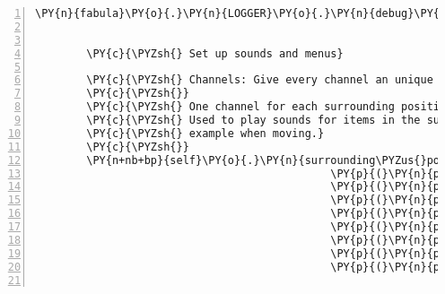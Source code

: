 \begin{Verbatim}[commandchars=\\\{\},numbers=left,firstnumber=1,stepnumber=1]
        \PY{n}{fabula}\PY{o}{.}\PY{n}{LOGGER}\PY{o}{.}\PY{n}{debug}\PY{p}{(}\PY{l+s}{\PYZdq{}}\PY{l+s}{Audio engine based on pyttsx added}\PY{l+s}{\PYZdq{}}\PY{p}{)}


        \PY{c}{\PYZsh{} Set up sounds and menus}

        \PY{c}{\PYZsh{} Channels: Give every channel an unique ID}
        \PY{c}{\PYZsh{}}
        \PY{c}{\PYZsh{} One channel for each surrounding position including client position.}
        \PY{c}{\PYZsh{} Used to play sounds for items in the surrounding positions \PYZhy{} for}
        \PY{c}{\PYZsh{} example when moving.}
        \PY{c}{\PYZsh{}}
        \PY{n+nb+bp}{self}\PY{o}{.}\PY{n}{surrounding\PYZus{}position\PYZus{}channels} \PY{o}{=} \PY{p}{[}\PY{p}{(}\PY{n}{pygame}\PY{o}{.}\PY{n}{mixer}\PY{o}{.}\PY{n}{Channel}\PY{p}{(}\PY{l+m+mi}{0}\PY{p}{)}\PY{p}{,} \PY{l+m+mf}{0.7}\PY{p}{,} \PY{l+m+mf}{0.5}\PY{p}{)}\PY{p}{,}
                                              \PY{p}{(}\PY{n}{pygame}\PY{o}{.}\PY{n}{mixer}\PY{o}{.}\PY{n}{Channel}\PY{p}{(}\PY{l+m+mi}{1}\PY{p}{)}\PY{p}{,} \PY{l+m+mf}{0.8}\PY{p}{,} \PY{l+m+mf}{0.8}\PY{p}{)}\PY{p}{,}
                                              \PY{p}{(}\PY{n}{pygame}\PY{o}{.}\PY{n}{mixer}\PY{o}{.}\PY{n}{Channel}\PY{p}{(}\PY{l+m+mi}{2}\PY{p}{)}\PY{p}{,} \PY{l+m+mf}{0.5}\PY{p}{,} \PY{l+m+mf}{0.7}\PY{p}{)}\PY{p}{,}
                                              \PY{p}{(}\PY{n}{pygame}\PY{o}{.}\PY{n}{mixer}\PY{o}{.}\PY{n}{Channel}\PY{p}{(}\PY{l+m+mi}{3}\PY{p}{)}\PY{p}{,} \PY{l+m+mf}{0.0}\PY{p}{,} \PY{l+m+mf}{0.8}\PY{p}{)}\PY{p}{,}
                                              \PY{p}{(}\PY{n}{pygame}\PY{o}{.}\PY{n}{mixer}\PY{o}{.}\PY{n}{Channel}\PY{p}{(}\PY{l+m+mi}{4}\PY{p}{)}\PY{p}{,} \PY{l+m+mf}{0.3}\PY{p}{,} \PY{l+m+mf}{0.5}\PY{p}{)}\PY{p}{,}
                                              \PY{p}{(}\PY{n}{pygame}\PY{o}{.}\PY{n}{mixer}\PY{o}{.}\PY{n}{Channel}\PY{p}{(}\PY{l+m+mi}{5}\PY{p}{)}\PY{p}{,} \PY{l+m+mf}{0.4}\PY{p}{,} \PY{l+m+mf}{0.4}\PY{p}{)}\PY{p}{,}
                                              \PY{p}{(}\PY{n}{pygame}\PY{o}{.}\PY{n}{mixer}\PY{o}{.}\PY{n}{Channel}\PY{p}{(}\PY{l+m+mi}{6}\PY{p}{)}\PY{p}{,} \PY{l+m+mf}{0.5}\PY{p}{,} \PY{l+m+mf}{0.3}\PY{p}{)}\PY{p}{,}
                                              \PY{p}{(}\PY{n}{pygame}\PY{o}{.}\PY{n}{mixer}\PY{o}{.}\PY{n}{Channel}\PY{p}{(}\PY{l+m+mi}{7}\PY{p}{)}\PY{p}{,} \PY{l+m+mf}{0.8}\PY{p}{,} \PY{l+m+mf}{0.0}\PY{p}{)}\PY{p}{,}
                                              \PY{p}{(}\PY{n}{pygame}\PY{o}{.}\PY{n}{mixer}\PY{o}{.}\PY{n}{Channel}\PY{p}{(}\PY{l+m+mi}{8}\PY{p}{)}\PY{p}{,} \PY{l+m+mi}{1}\PY{p}{,} \PY{l+m+mi}{1}\PY{p}{)}\PY{p}{]}


\end{Verbatim}
